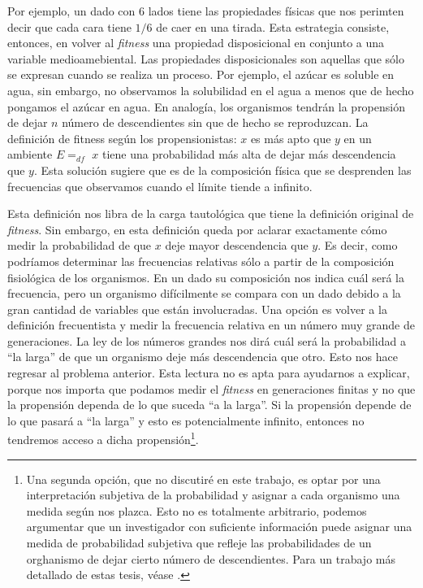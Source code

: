 Por ejemplo, un dado con 6 lados tiene las propiedades físicas que nos perimten decir que cada cara tiene $1/6$ de caer en una tirada. Esta estrategia consiste, entonces, en volver al \emph{fitness} una propiedad disposicional en conjunto a una variable medioamebiental. Las propiedades disposicionales son aquellas que sólo se expresan cuando se realiza un proceso. Por ejemplo, el azúcar es soluble en agua, sin embargo, no observamos la solubilidad en el agua a menos que de hecho pongamos el azúcar en agua. En analogía, los organismos tendrán la propensión de dejar $n$ número de descendientes sin que de hecho se reproduzcan. La definición de fitness según los propensionistas: $x$ es más apto que $y$ en un ambiente $E =_{df}$ $x$ tiene una probabilidad más alta de dejar más descendencia que $y$. Esta solución sugiere que es de la composición física que se desprenden las frecuencias que observamos cuando el límite tiende a infinito.

Esta definición nos libra de la carga tautológica que tiene la definición original de \emph{fitness}. Sin embargo, en esta definición queda por aclarar exactamente cómo medir la probabilidad de que $x$ deje mayor descendencia que $y$. Es decir, como podríamos determinar las frecuencias relativas sólo a partir de la composición fisiológica de los organismos. En un dado su composición nos indica cuál será la frecuencia, pero un organismo difícilmente se compara con un dado debido a la gran cantidad de variables que están involucradas. Una opción es volver a la definición frecuentista y medir la frecuencia relativa en un número muy grande de generaciones. La ley de los números grandes nos dirá cuál será la probabilidad a ``la larga'' de que un organismo deje más descendencia que otro. Esto nos hace regresar al problema anterior. Esta lectura no es apta para ayudarnos a explicar, porque nos importa que podamos medir el \emph{fitness} en generaciones finitas y no que la propensión dependa de lo que suceda ``a la larga''. Si la propensión depende de lo que pasará a ``la larga'' y esto es potencialmente infinito, entonces no tendremos acceso a dicha propensión\footnote{Una segunda opción, que no discutiré en este trabajo, es optar por una interpretación subjetiva de la probabilidad y asignar a cada organismo una medida según nos plazca. Esto no es totalmente arbitrario, podemos argumentar que un investigador con suficiente información puede asignar una medida de probabilidad subjetiva que refleje las probabilidades de un orghanismo de dejar cierto número de descendientes. Para un trabajo más detallado de estas tesis, véase \cite{Suarez2021}.}.

